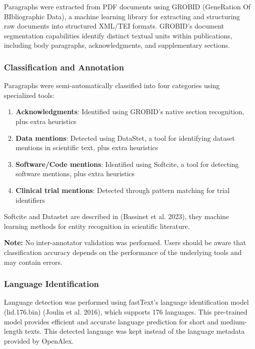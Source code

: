 \documentclass[
]{article}
\providecommand{\tightlist}{%
  \setlength{\itemsep}{0pt}\setlength{\parskip}{0pt}}
\begin{document}
Paragraphs were extracted from PDF documents using GROBID (GeneRation Of
BIbliographic Data), a machine learning library for extracting and
structuring raw documents into structured XML/TEI formats. GROBID's
document segmentation capabilities identify distinct textual units
within publications, including body paragraphs, acknowledgments, and
supplementary sections.

\hypertarget{classification-and-annotation}{%
\subsubsection{Classification and
Annotation}\label{classification-and-annotation}}

Paragraphs were semi-automatically classified into four categories using
specialized tools:

\begin{enumerate}
\def\labelenumi{\arabic{enumi}.}
\tightlist
\item
  \textbf{Acknowledgments}: Identified using GROBID's native section
  recognition, plus extra heuristics
\item
  \textbf{Data mentions}: Detected using DataStet, a tool for
  identifying dataset mentions in scientific text, plus extra heuristics
\item
  \textbf{Software/Code mentions}: Identified using Softcite, a tool for
  detecting software mentions, plus extra heuristics
\item
  \textbf{Clinical trial mentions}: Detected through pattern matching
  for trial identifiers
\end{enumerate}

Softcite and Datastet are described in (Bassinet et al. 2023), they
machine learning methods for entity recognition in scientific
literature.

\textbf{Note:} No inter-annotator validation was performed. Users should
be aware that classification accuracy depends on the performance of the
underlying tools and may contain errors.

\hypertarget{language-identification}{%
\subsubsection{Language Identification}\label{language-identification}}

Language detection was performed using fastText's language
identification model (lid.176.bin) (Joulin et al. 2016), which supports
176 languages. This pre-trained model provides efficient and accurate
language prediction for short and medium-length texts. This detected
language was kept instead of the language metadata provided by OpenAlex.
\end{document}
